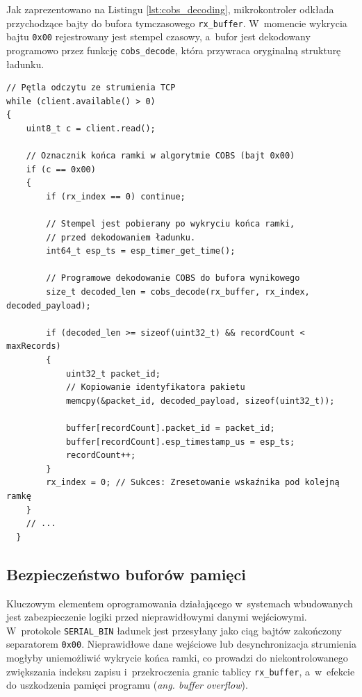 Jak zaprezentowano na Listingu \ref{lst:cobs_decoding}, mikrokontroler odkłada przychodzące bajty do bufora tymczasowego \texttt{rx\_buffer}.
W~momencie wykrycia bajtu \texttt{0x00} rejestrowany jest stempel czasowy, a~bufor jest dekodowany programowo przez funkcję \texttt{cobs\_decode}, która przywraca oryginalną strukturę ładunku.

\begin{listing}[htbp]
  \caption{Stemplowanie w~czasie i~programowe dekodowanie binarnych ramek COBS w~strumieniu TCP (\texttt{TcpDataPlane.cpp}) \cite{espy_nexus_esp32_firmware}.}
    \label{lst:cobs_decoding}
    \begin{verbatim}
// Pętla odczytu ze strumienia TCP
while (client.available() > 0)
{
    uint8_t c = client.read();

    // Oznacznik końca ramki w algorytmie COBS (bajt 0x00)
    if (c == 0x00)
    {
        if (rx_index == 0) continue;

        // Stempel jest pobierany po wykryciu końca ramki,
        // przed dekodowaniem ładunku.
        int64_t esp_ts = esp_timer_get_time();

        // Programowe dekodowanie COBS do bufora wynikowego
        size_t decoded_len = cobs_decode(rx_buffer, rx_index, decoded_payload);

        if (decoded_len >= sizeof(uint32_t) && recordCount < maxRecords)
        {
            uint32_t packet_id;
            // Kopiowanie identyfikatora pakietu
            memcpy(&packet_id, decoded_payload, sizeof(uint32_t));

            buffer[recordCount].packet_id = packet_id;
            buffer[recordCount].esp_timestamp_us = esp_ts;
            recordCount++;
        }
        rx_index = 0; // Sukces: Zresetowanie wskaźnika pod kolejną ramkę
    }
    // ...
  }
\end{verbatim}
\end{listing}

\subsection{Bezpieczeństwo buforów pamięci}
\label{sec:bezpieczenstwo_buforow_pamieci}

Kluczowym elementem oprogramowania działającego w~systemach wbudowanych jest zabezpieczenie logiki przed nieprawidłowymi danymi wejściowymi.
W~protokole \texttt{SERIAL\_BIN} ładunek jest przesyłany jako ciąg bajtów zakończony separatorem \texttt{0x00}.
Nieprawidłowe dane wejściowe lub desynchronizacja strumienia mogłyby uniemożliwić wykrycie końca ramki, co prowadzi do niekontrolowanego zwiększania indeksu zapisu i~przekroczenia granic tablicy \texttt{rx\_buffer}, a~w~efekcie do uszkodzenia pamięci programu (\textit{ang. buffer overflow}).

